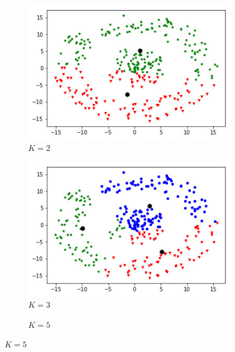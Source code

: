 \documentclass[../thesis.tex]{subfiles}
\begin{document}
    \vspace{-0.5em}
    \begin{figure}[H]
        \centering
        \begin{subfigure}[b]{0.3\textwidth}
            \centering
            \caption*{$K=2$}
            \includegraphics[width=\linewidth]{img/biblio/classification-kmean-2}
        \end{subfigure}
        \begin{subfigure}[b]{0.3\textwidth}
            \centering
            \caption*{$K=3$}
            \includegraphics[width=\linewidth]{img/biblio/classification-kmean-3}
        \end{subfigure}
        \begin{subfigure}[b]{0.3\textwidth}
            \centering
            \caption*{$K=5$}

\end{subfigure}
\end{figure}
\end{document}
